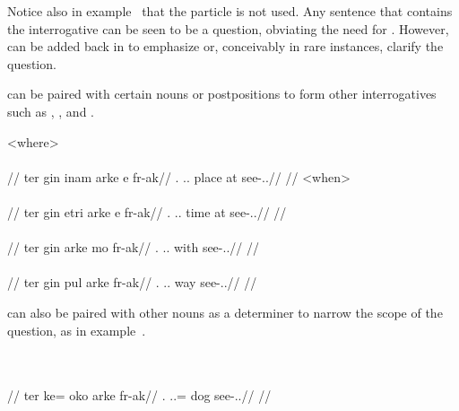 Notice also in example~ that the particle   is not used. Any sentence that contains the interrogative   can be seen to be a question, obviating the need for  . However,   can be added back in to emphasize or, conceivably in rare instances, clarify the question.

  can be paired with certain nouns or postpositions to form other interrogatives such as , , and .

	\a<where>\begingl
		\glpreamble{}\\
		\\
		//
		\gla ter gin inam arke e fr-ak//
		\glb \Sps.\Abs{} \Tps.\In.\Top{} place \Int{} at see-\Ind.\Pst.\Pfv//
		\glft{}//
	\endgl
	\a<when>\begingl
		\glpreamble{}\\
		\\
		//
		\gla ter gin etri arke e fr-ak//
		\glb \Sps.\Abs{} \Tps.\In.\Top{} time \Int{} at see-\Ind.\Pst.\Pfv//
		\glft{}//
	\endgl
	\a<how-tool>\begingl
		\glpreamble{}\\
		\\
		//
		\gla ter gin arke mo fr-ak//
		\glb \Sps.\Abs{} \Tps.\In.\Top{} \Int{} with see-\Ind.\Pst.\Pfv//
		\glft{}//
	\endgl
	\a<how-method>\begingl
		\glpreamble{}\\
		\\
		//
		\gla ter gin pul arke fr-ak//
		\glb \Sps.\Abs{} \Tps.\In.\Top{} way \Int{} see-\Ind.\Pst.\Pfv//
		\glft{}//
	\endgl
\xe

  can also be paired with other nouns as a determiner to narrow the scope of the question, as in example~.

	\begingl
		\glpreamble{}\\
		\\
		//
		\gla ter ke= oko arke fr-ak//
		\glb \Sps.\Abs{} \An.\Sg.\Dat= dog \Int{} see-\Ind.\Pst.\Pfv//
		\glft{}//
	\endgl
\xe

